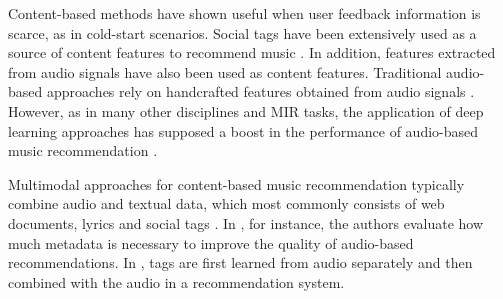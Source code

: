 Content-based methods have shown useful when user feedback information is scarce, as in cold-start scenarios. Social tags have been extensively used as a source of content features to recommend music \citep{Knees2013}. In addition, features extracted from audio signals have also been used as content features. Traditional audio-based approaches rely on handcrafted features obtained from audio signals \citep{Bogdanov2013rec}. However, as in many other disciplines and MIR tasks, the application of deep learning approaches has supposed a boost in the performance of audio-based music recommendation \citep{Oord2013}. 

Multimodal approaches for content-based music recommendation typically combine audio and textual data, which most commonly consists of web documents, lyrics and social tags \citep{liem2011need}. In \citep{Bogdanov2011}, for instance, the authors evaluate how much metadata is necessary to improve the quality of audio-based recommendations. In \citep{Eck:NIPS2007}, tags are first learned from audio separately and then combined with the audio in a recommendation system. 

